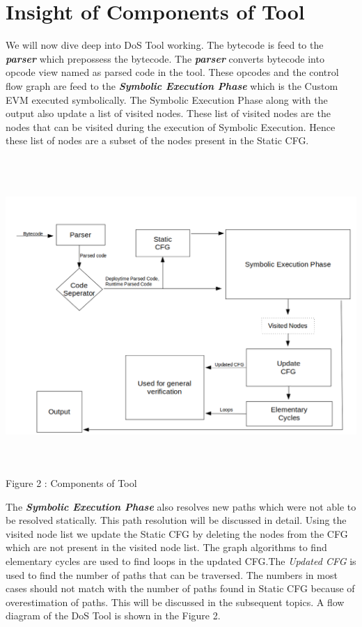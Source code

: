 \section{Insight of Components of Tool}
We will now dive deep into DoS Tool working. The bytecode is feed to the \textbf{\emph{parser}} which prepossess the bytecode. The \textbf{\emph{parser}} converts bytecode into opcode view named as parsed code in the tool. These opcodes and the control flow graph are feed to the \textbf{\emph{Symbolic Execution Phase}} which is the Custom EVM executed symbolically. The Symbolic Execution Phase along with the output also update a list of visited nodes. These list of visited nodes are the nodes that can be visited during the execution of Symbolic Execution. Hence these list of nodes are a subset of the nodes present in the Static CFG.\\ 
\begin{center}
\includegraphics[width = 14cm, height = 12cm]{images/2.png}
Figure 2 : Components of Tool
\end{center}
The \textbf{\emph{Symbolic Execution Phase}} also resolves new paths which were not able to be resolved statically. This path resolution will be discussed in detail. Using the visited node list we update the Static CFG by deleting the nodes from the CFG which are not present in the visited node list. The graph algorithms to find elementary cycles are used to find loops in the updated CFG.The \emph{Updated CFG} is used to find the number of paths that can be traversed. The numbers in most cases should not match with the number of paths found in Static CFG because of overestimation of paths. This will be discussed in the subsequent topics. A flow diagram of the DoS Tool is shown in the Figure 2.


